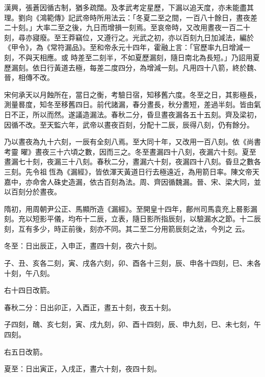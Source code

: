 \begin{pinyinscope}
 漢興，張蒼因循古制，猶多疏闊。及孝武考定星歷，下漏以追天度，亦未能盡其理。劉向《鴻範傳》記武帝時所用法云：「冬夏二至之間，一百八十餘日，晝夜差二十刻。」大率二至之後，九日而增損一刻焉。至哀帝時，又改用晝夜一百二十刻，尋亦寢廢。至王莽竊位，又遵行之。光武之初，亦以百刻九日加減法，編於《甲令》，為《常符漏品》。至和帝永元十四年，霍融上言：「官歷率九日增減一刻，不與天相應。或
 時差至二刻半，不如夏歷漏刻，隨日南北為長短。」乃詔用夏歷漏刻。依日行黃道去極，每差二度四分，為增減一刻。凡用四十八箭，終於魏、晉，相傳不改。



 宋何承天以月蝕所在，當日之衡，考驗日宿，知移舊六度。冬至之日，其影極長，測量晷度，知冬至移舊四日。前代諸漏，春分晝長，秋分晝短，差過半刻。皆由氣日不正，所以而然。遂議造漏法。春秋二分，昏旦晝夜漏各五十五刻。齊及梁初，因循不改。至天監六年，武帝以晝夜百刻，分配十二辰，辰得八刻，仍有餘分。



 乃以晝夜為九十六刻，一辰有全刻八焉。至大同十年，又改用一百八刻。依《尚書考靈
 曜》晝夜三十六頃之數，因而三之。冬至晝漏四十八刻，夜漏六十刻。夏至晝漏七十刻，夜漏三十八刻。春秋二分，晝漏六十刻，夜漏四十八刻。昏旦之數各三刻。先令祖恆為《漏經》，皆依渾天黃道日行去極遠近，為用箭日率。陳文帝天嘉中，亦命舍人硃史造漏，依古百刻為法。周、齊因循魏漏。晉、宋、梁大同，並以百刻分於晝夜。



 隋初，用周朝尹公正、馬顯所造《漏經》。至開皇十四年，鄜州司馬袁充上晷影漏刻。充以短影平儀，均布十二辰，立表，隨日影所指辰刻，以驗漏水之節。十二辰刻，互有多少，時正前後，刻亦不同。其二至二分用箭辰刻之法，今列之
 云。



 冬至：日出辰正，入申正，晝四十刻，夜六十刻。



 子、丑、亥各二刻，寅、戌各六刻，卯、酉各十三刻，辰、申各十四刻，巳、未各十刻，午八刻。



 右十四日改箭。



 春秋二分：日出卯正，入酉正，晝五十刻，夜五十刻。



 子四刻，醜、亥七刻，寅、戌九刻，卯、酉十四刻，辰、申九刻，巳、未七刻，午四刻。



 右五日改箭。



 夏至：日出寅正，入戌正，晝六十刻，夜四十刻。




\end{pinyinscope}
